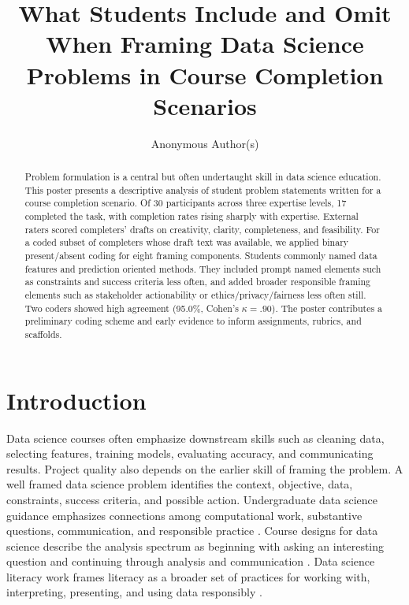 \documentclass[sigconf,screen,anonymous]{acmart}
\begin{document}
\title{What Students Include and Omit When Framing Data Science Problems in Course Completion Scenarios}

\author{Anonymous Author(s)}

\begin{abstract}
Problem formulation is a central but often undertaught skill in data science education. This poster presents a descriptive analysis of student problem statements written for a course completion scenario. Of 30 participants across three expertise levels, 17 completed the task, with completion rates rising sharply with expertise. External raters scored completers' drafts on creativity, clarity, completeness, and feasibility. For a coded subset of completers whose draft text was available, we applied binary present/absent coding for eight framing components. Students commonly named data features and prediction oriented methods. They included prompt named elements such as constraints and success criteria less often, and added broader responsible framing elements such as stakeholder actionability or ethics/privacy/fairness less often still. Two coders showed high agreement (95.0\%, Cohen's $\kappa=.90$). The poster contributes a preliminary coding scheme and early evidence to inform assignments, rubrics, and scaffolds.
\end{abstract}


\maketitle

\section{Introduction}
Data science courses often emphasize downstream skills such as cleaning data, selecting features, training models, evaluating accuracy, and communicating results. Project quality also depends on the earlier skill of framing the problem. A well framed data science problem identifies the context, objective, data, constraints, success criteria, and possible action. Undergraduate data science guidance emphasizes connections among computational work, substantive questions, communication, and responsible practice \cite{nasem2018data}. Course designs for data science describe the analysis spectrum as beginning with asking an interesting question and continuing through analysis and communication \cite{baumer2015course}. Data science literacy work frames literacy as a broader set of practices for working with, interpreting, presenting, and using data responsibly \cite{dichev2017data}.
\end{document}
